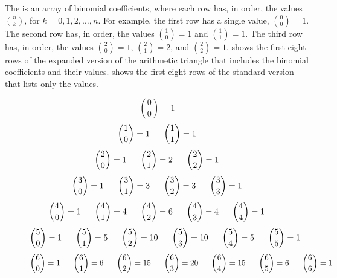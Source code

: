 \begin{defn}
\label{defn_arith_triangle}
    The  is an array of binomial coefficients, where each row has, in order, the values $\binom{n}{k}$, for $k=0,1,2, \ldots, n$. For example, the first row has a single value, $\binom{0}{0}=1$.  The second row has, in order, the values $\binom{1}{0}=1$ and $\binom{1}{1}=1$.  The third row has, in order, the values $\binom{2}{0}=1$, $\binom{2}{1}=2$, and $\binom{2}{2}=1$.  shows the first eight rows of the expanded version of the arithmetic triangle that includes the binomial coefficients and their values.  shows the first eight rows of the standard version that lists only the values.

        \begin{figure}[hbtp]
            \centering
                $$\binom{0}{0}=1$$ 
                $$\binom{1}{0}=1 \hspace{.23in} \binom{1}{1}=1$$ 
                $$\binom{2}{0}=1 \hspace{.23in} \binom{2}{1}=2 \hspace{.23in} \binom{2}{2}=1$$ 
                $$\binom{3}{0}=1 \hspace{.23in} \binom{3}{1}=3 \hspace{.23in} \binom{3}{2}=3\hspace{.23in} \binom{3}{3}=1$$ 
                $$\binom{4}{0}=1 \hspace{.23in} \binom{4}{1}=4 \hspace{.23in} \binom{4}{2}=6 \hspace{.23in} \binom{4}{3}=4\hspace{.23in} \binom{4}{4}=1$$ 
                $$\binom{5}{0}=1 \hspace{.23in} \binom{5}{1}=5 \hspace{.23in} \binom{5}{2}=10 \hspace{.23in} \binom{5}{3}=10\hspace{.23in} \binom{5}{4}=5\hspace{.23in} \binom{5}{5}=1$$ 
                $$\binom{6}{0}=1 \hspace{.23in} \binom{6}{1}=6\hspace{.23in} \binom{6}{2}=15 \hspace{.23in} \binom{6}{3}=20\hspace{.23in} \binom{6}{4}=15\hspace{.23in} \binom{6}{5}=6\hspace{.23in} \binom{6}{6}=1$$ 

\end{figure}
\end{defn}
